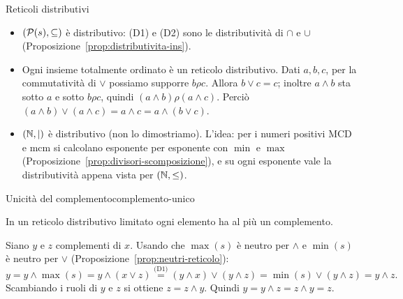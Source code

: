 \begin{esempio}{Reticoli distributivi}
    \begin{itemize}
        \item $(\mathcal{P}(s), \subseteq)$ è distributivo: (D1) e (D2) sono le distributività di $\cap$ e $\cup$ (Proposizione~\ref{prop:distributivita-ins}).
        \item Ogni insieme totalmente ordinato è un reticolo distributivo. Dati $a, b, c$, per la commutatività di $\vee$ possiamo supporre $b \rho c$. Allora
              $b \vee c = c$; inoltre $a \wedge b$ sta sotto $a$ e sotto $b \rho c$, quindi $(a \wedge b) \rho (a \wedge c)$. Perciò
              $(a \wedge b) \vee (a \wedge c) = a \wedge c = a \wedge (b \vee c)$.
        \item $(\mathbb{N}, \mid)$ è distributivo (non lo dimostriamo). L'idea: per i numeri positivi MCD e mcm si calcolano esponente per esponente con
              $\min$ e $\max$ (Proposizione~\ref{prop:divisori-scomposizione}), e su ogni esponente vale la distributività appena vista per $(\mathbb{N}, \leq)$.
    \end{itemize}
\end{esempio}

\begin{concetto}
\begin{Teorema}{Unicità del complemento}{complemento-unico}
    \begin{prerequisiti}
    \end{prerequisiti}
    In un reticolo distributivo limitato ogni elemento ha al più un complemento.
\end{Teorema}
\begin{dimostrazione}
    Siano $y$ e $z$ complementi di $x$. Usando che $\max(s)$ è neutro per $\wedge$ e $\min(s)$ è neutro per $\vee$ (Proposizione~\ref{prop:neutri-reticolo}):
    \[ y = y \wedge \max(s) = y \wedge (x \vee z) \overset{\text{(D1)}}{=} (y \wedge x) \vee (y \wedge z) = \min(s) \vee (y \wedge z) = y \wedge z. \]
    Scambiando i ruoli di $y$ e $z$ si ottiene $z = z \wedge y$. Quindi $y = y \wedge z = z \wedge y = z$.
\end{dimostrazione}
\end{concetto}

